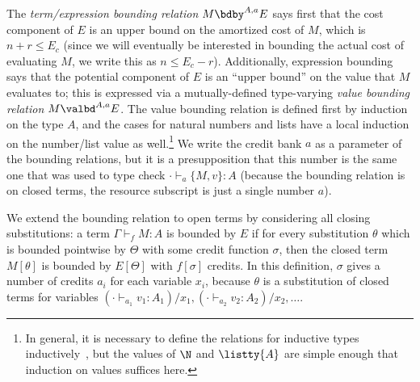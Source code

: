 The \emph{term/expression bounding relation} $M \bdby^{A,a} E$ says
first that the cost component of $E$ is an upper bound on the amortized
cost of $M$, which is $n + r \leq E_c$ (since we will eventually be
interested in bounding the actual cost of evaluating $M$, we write this
as $n \leq E_c - r$).  Additionally, expression bounding says that the
potential component of $E$ is an ``upper bound'' on the value that $M$
evaluates to; this is expressed via a mutually-defined type-varying
\emph{value bounding relation} $M \valbd^{A,a} E$.  The value bounding
relation is defined first by induction on the type $A$, and the cases
for natural numbers and lists have a local induction on the number/list
value as well.\footnote{In general, it is necessary to define the
  relations for inductive types inductively~\cite{danner-et-al:icfp15},
  but the values of $\N$ and $\listty{A}$ are simple enough that
  induction on values suffices here.}  We write the credit bank $a$ as a
parameter of the bounding relations, but it is a presupposition that
this number is the same one that was used to type check $\cdot \vdash_a
\{M,v\} : A$ (because the bounding relation is on closed terms, the resource
subscript is just a single number $a$).  



We extend the bounding relation to open terms by considering all closing
substitutions: a term $\Gamma \vdash_f M : A$ is bounded by $E$ if for
every substitution $\theta$ which is bounded pointwise by $\Theta$ with
some credit function $\sigma$, then the closed term $M[\theta]$ is
bounded by $E[\Theta]$ with $f[\sigma]$ credits.  In this definition,
$\sigma$ gives a number of credits $a_i$ for each variable $x_i$,
because $\theta$ is a substitution of closed terms for variables $(\cdot
\vdash_{a_1} v_1 : A_1) / x_1, (\cdot \vdash_{a_2} v_2 : A_2) / x_2,
\ldots$.

